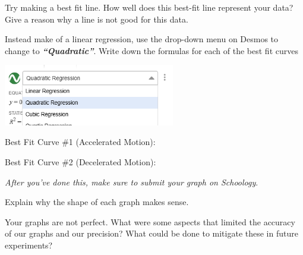 \documentclass[10pt]{exam}
\begin{document}
\begin{questions}

  \question
    Try making a best fit line.  How well does this best-fit line represent your data?  Give a reason why a line is not good for this data.
    \vs

  \question
    Instead make of a linear regression, use the drop-down menu on Desmos to change to \textbf{\it ``Quadratic''}.  Write down the formulas for each of the best fit curves

    \begin{multicols}{2}
    

    \includegraphics[width=7.5cm]{desmos4}
    
    \vspace{1em}

    Best Fit Curve \#1 (Accelerated Motion):

    \vspace{3em}

    Best Fit Curve \#2 (Decelerated Motion):

    \vspace*{3em}

  \end{multicols}

    \emph{After you've done this, make sure to submit your graph on Schoology}.
      
  \question
    Explain why the shape of each graph makes sense.  
    \vs

  
  \question
    Your graphs are not perfect.  What were some aspects that limited the accuracy of our graphs and our precision?  What could be done to mitigate these in future experiments?
    \vs
  
  


\end{questions}
\end{document}
